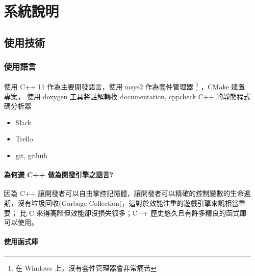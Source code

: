 \chapter{系統說明}

\section{使用技術}

\subsection{使用語言}

使用 C++ 11 作為主要開發語言，使用 msys2 作為套件管理器 \footnote{在 Windows 上，沒有套件管理器會非常痛苦} ，CMake 建置專案，
使用 doxygen 工具將註解轉換 documentation, cppcheck C++ 的靜態程式碼分析器

\begin{itemize}
	\item{Slack}
	\item{Trello}
	\item{git, github}
\end{itemize}

\subsubsection{為何選 C++ 做為開發引擎之語言?}

因為 C++ 讓開發者可以自由掌控記憶體，讓開發者可以精確的控制變數的生命週期，沒有垃圾回收(Garbage Collection)，這對於效能注重的遊戲引擎來說相當重要；
比 C 來得高階但效能卻沒損失很多；C++ 歷史悠久且有許多精良的函式庫可以使用。 \cite{WhyCppUsedInGameEngine}

\subsubsection{使用函式庫}


